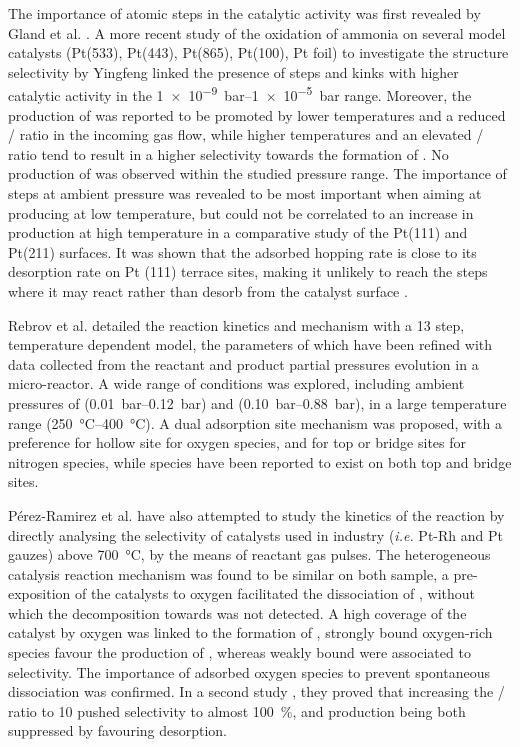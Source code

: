 The importance of atomic steps in the catalytic activity was first revealed by Gland et al. \parencite*{Gland1978, Gland1980}.
A more recent study of the oxidation of ammonia on several model catalysts (Pt(533), Pt(443), Pt(865), Pt(100), Pt foil) to investigate the structure selectivity by Yingfeng \parencite*{Yingfeng2008} linked the presence of steps and kinks with higher catalytic activity in the \qtyrange{1e-9}{1e-5}{\bar} range.
Moreover, the production of  was reported to be promoted by lower temperatures and a reduced / ratio in the incoming gas flow, while higher temperatures and an elevated / ratio tend to result in a higher selectivity towards the formation of  \parencite{Zeng2009}.
No production of  was observed within the studied pressure range.
The importance of steps at ambient pressure was revealed to be most important when aiming at producing  at low temperature, but could not be correlated to an increase in  production at high temperature in a comparative study of the Pt(111) and Pt(211) surfaces.
It was shown that the adsorbed  hopping rate is close to its desorption rate on Pt (111) terrace sites, making it unlikely to reach the steps where it may react rather than desorb from the catalyst surface \parencite{Borodin2021}.

Rebrov et al. \parencite*{Rebrov2002} detailed the reaction kinetics and mechanism with a 13 step, temperature dependent model, the parameters of which have been refined with data collected from the reactant and product partial pressures evolution in a micro-reactor.
A wide range of conditions was explored, including ambient pressures of  (\qtyrange{0.01}{0.12}{\bar}) and  (\qtyrange{0.10}{0.88}{\bar}), in a large temperature range (\qtyrange{250}{400}{\degreeCelsius}).
A dual adsorption site mechanism was proposed, with a preference for hollow site for oxygen species, and for top or bridge sites for nitrogen species, while  species have been reported to exist on both top and bridge sites.

Pérez-Ramirez et al. \parencite*{PerezRamirez2004} have also attempted to study the kinetics of the reaction by directly analysing the selectivity of catalysts used in industry (\textit{i.e.} Pt-Rh and Pt gauzes) above \qty{700}{\degreeCelsius}, by the means of reactant gas pulses.
The heterogeneous catalysis reaction mechanism was found to be similar on both sample, a pre-exposition of the catalysts to oxygen facilitated the dissociation of , without which the decomposition towards  was not detected.
A high coverage of the catalyst by oxygen was linked to the formation of , strongly bound oxygen-rich species favour the production of , whereas weakly bound were associated to  selectivity.
The importance of adsorbed oxygen species to prevent spontaneous  dissociation was confirmed.
In a second study \parencite{PerezRamirez2009}, they proved that increasing the / ratio to 10 pushed  selectivity to almost \qty{100}{\percent},  and  production being both suppressed by favouring  desorption.

